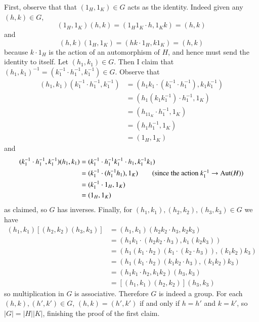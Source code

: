 \documentclass[12pt, a4paper, twoside, openright, titlepage]{book}
\begin{document}
\begin{proof*}{}{}
    First, observe that that $(1_H,1_K) \in G$ acts as the identity. Indeed given any $(h,k) \in G$, \begin{equation*}
        (1_H,1_K)(h,k) = (1_H1_K\cdot h,1_Kk) = (h,k)
    \end{equation*}
    and \begin{equation*}
        (h,k)(1_H,1_K) = (hk\cdot 1_H, k1_K) = (h,k)
    \end{equation*}
    because $k\cdot1_H$ is the action of an automorphism of $H$, and hence must send the identity to itself. Let $(h_1,k_1) \in G$. Then I claim that $(h_1,k_1)^{-1} = (k_1^{-1}\cdot h_1^{-1},k_1^{-1}) \in G$. Observe that \begin{align*}
        (h_1,k_1)(k_1^{-1}\cdot h_1^{-1},k_1^{-1}) &= (h_1k_1\cdot(k_1^{-1}\cdot h_1^{-1}),k_1k_1^{-1}) \\
        &= (h_1(k_1k_1^{-1})\cdot h_1^{-1}, 1_K) \\
        &= (h_11_K\cdot h_1^{-1},1_K) \\
        &= (h_1h_1^{-1},1_K) \\
        &= (1_H,1_K)
    \end{align*}
    and \begin{align*}
        (k_1^{-1}\cdot h_1^{-1},k_1^{-1})(h_1,k_1) &= (k_1^{-1}\cdot h_1^{-1}k_1^{-1}\cdot h_1,k_1^{-1}k_1) \\
        &= (k_1^{-1}\cdot (h_1^{-1}h_1),1_K) \tag{since the action $k_1^{-1}\rightarrow\aut(H)$} \\
        &= (k_1^{-1}\cdot 1_H,1_K) \\
        &= (1_H,1_K)
    \end{align*}
    as claimed, so $G$ has inverses. Finally, for $(h_1,k_1),(h_2,k_2),(h_3,k_3) \in G$ we have \begin{align*}
        (h_1,k_1)[(h_2,k_2)(h_3,k_3)] &= (h_1,k_1)(h_2k_2\cdot h_3,k_2k_3) \\
        &= (h_1k_1\cdot(h_2k_2\cdot h_3), k_1(k_2k_3)) \\
        &= (h_1(k_1\cdot h_2)(k_1\cdot(k_2\cdot h_3)), (k_1k_2)k_3) \\
        &= (h_1(k_1\cdot h_2)(k_1k_2\cdot h_3),(k_1k_2)k_3) \\
        &= (h_1k_1\cdot h_2, k_1k_2)(h_3, k_3) \\
        &= [(h_1,k_1)(h_2,k_2)](h_3,k_3)
    \end{align*}
    so multiplication in $G$ is associative. Therefore $G$ is indeed a group. For each $(h,k), (h',k') \in G$, $(h,k) = (h',k')$ if and only if $h=h'$ and $k=k'$, so $|G| = |H||K|$, finishing the proof of the first claim.


\end{proof*}
\end{document}
